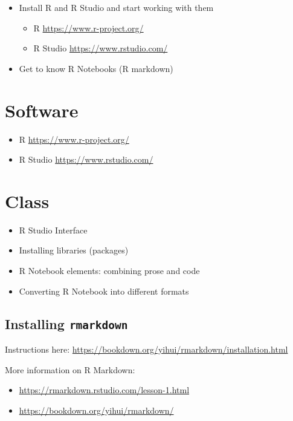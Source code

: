 \documentclass[
]{book}
\providecommand{\tightlist}{%
  \setlength{\itemsep}{0pt}\setlength{\parskip}{0pt}}
\begin{document}
\begin{itemize}
\tightlist
\item
  Install R and R Studio and start working with them

  \begin{itemize}
  \tightlist
  \item
    R \url{https://www.r-project.org/}
  \item
    R Studio \url{https://www.rstudio.com/}
  \end{itemize}
\item
  Get to know R Notebooks (R markdown)
\end{itemize}

\hypertarget{L01_sw}{%
\section{Software}\label{L01_sw}}

\begin{itemize}
\tightlist
\item
  R \url{https://www.r-project.org/}
\item
  R Studio \url{https://www.rstudio.com/}
\end{itemize}

\hypertarget{L01_class}{%
\section{Class}\label{L01_class}}

\begin{itemize}
\tightlist
\item
  R Studio Interface
\item
  Installing libraries (packages)
\item
  R Notebook elements: combining prose and code
\item
  Converting R Notebook into different formats
\end{itemize}

\hypertarget{installing-rmarkdown}{%
\subsection{\texorpdfstring{Installing \texttt{rmarkdown}}{Installing rmarkdown}}\label{installing-rmarkdown}}

Instructions here: \url{https://bookdown.org/yihui/rmarkdown/installation.html}

More information on R Markdown:

\begin{itemize}
\tightlist
\item
  \url{https://rmarkdown.rstudio.com/lesson-1.html}
\item
  \url{https://bookdown.org/yihui/rmarkdown/}
\end{itemize}
\end{document}
